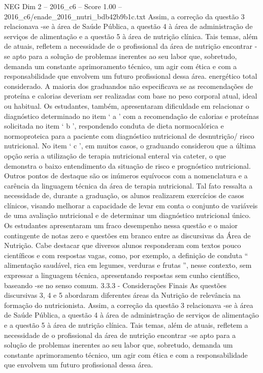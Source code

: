 \begin{textsample}{NEG Dim 2 – 2016\_c6 – Score 1.00 – 2016\_c6/enade\_2016\_nutri\_bdb42b9b1c.txt}
Assim, a correção da questão 3 relacionava -se à área de Saúde Pública, a questão 4 à área de administração de serviços de alimentação e a questão 5 à área de nutrição clínica.
Tais temas, além de atuais, refletem a necessidade de o profissional da área de nutrição encontrar -se apto para a solução de problemas inerentes ao seu labor que, sobretudo, demanda um constante aprimoramento técnico, um agir com ética e com a responsabilidade que envolvem um futuro profissional dessa área. energético total considerado.
A maioria dos graduandos não especificava se as recomendações de proteína e calorias deveriam ser realizadas com base no peso corporal atual, ideal ou habitual.
Os estudantes, também, apresentaram dificuldade em relacionar o diagnóstico determinado no item ‘ a ’ com a recomendação de calorias e proteínas solicitada no item ‘ b ’, respondendo conduta de dieta normocalórica e normoproteica para a paciente com diagnóstico nutricional de desnutrição/ risco nutricional.
No item ‘ c ’, em muitos casos, o graduando considerou que a última opção seria a utilização de terapia nutricional enteral via cateter, o que demonstra o baixo entendimento da situação de risco e prognóstico nutricional.
Outros pontos de destaque são os inúmeros equívocos com a nomenclatura e a carência da linguagem técnica da área de terapia nutricional.
Tal fato ressalta a necessidade de, durante a graduação, os alunos realizarem exercícios de casos clínicos, visando melhorar a capacidade de levar em conta o conjunto de variáveis de uma avaliação nutricional e de determinar um diagnóstico nutricional único.
Os estudantes apresentaram um fraco desempenho nessa questão e o maior contingente de notas zero e questões em branco entre as discursivas da Área de Nutrição.
Cabe destacar que diversos alunos responderam com textos pouco científicos e com respostas vagas, como, por exemplo, a definição de conduta “ alimentação saudável, rica em legumes, verduras e frutas ”, nesse contexto, sem expressar a linguagem técnica, apresentando respostas sem cunho científico, baseando -se no senso comum. 3.3.3 - Considerações Finais As questões discursivas 3, 4 e 5 abordaram diferentes áreas da Nutrição de relevância na formação do nutricionista.
Assim, a correção da questão 3 relacionava -se à área de Saúde Pública, a questão 4 à área de administração de serviços de alimentação e a questão 5 à área de nutrição clínica.
Tais temas, além de atuais, refletem a necessidade de o profissional da área de nutrição encontrar -se apto para a solução de problemas inerentes ao seu labor que, sobretudo, demanda um constante aprimoramento técnico, um agir com ética e com a responsabilidade que envolvem um futuro profissional dessa área.

\end{textsample}
